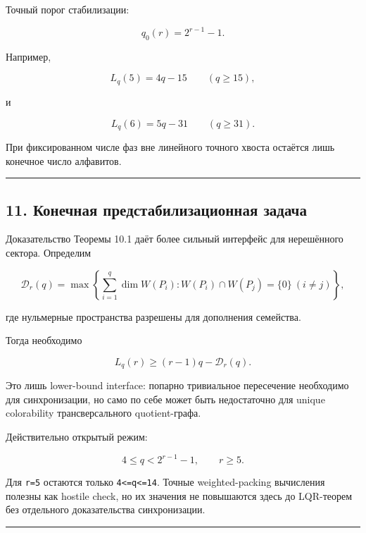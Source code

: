 Точный порог стабилизации:

\[
\boxed{q_0(r)=2^{r-1}-1.}
\tag{55}
\]

Например,

\[
L_q(5)=4q-15\qquad(q\ge15),
\tag{56}
\]

и

\[
L_q(6)=5q-31\qquad(q\ge31).
\tag{57}
\]

При фиксированном числе фаз вне линейного точного хвоста остаётся лишь
конечное число алфавитов.

\begin{center}\rule{0.5\linewidth}{0.5pt}\end{center}

\hypertarget{ux43aux43eux43dux435ux447ux43dux430ux44f-ux43fux440ux435ux434ux441ux442ux430ux431ux438ux43bux438ux437ux430ux446ux438ux43eux43dux43dux430ux44f-ux437ux430ux434ux430ux447ux430}{%
\subsection{11. Конечная предстабилизационная
задача}\label{ux43aux43eux43dux435ux447ux43dux430ux44f-ux43fux440ux435ux434ux441ux442ux430ux431ux438ux43bux438ux437ux430ux446ux438ux43eux43dux43dux430ux44f-ux437ux430ux434ux430ux447ux430}}

Доказательство Теоремы 10.1 даёт более сильный интерфейс для нерешённого
сектора. Определим

\[
\mathcal D_r(q)
=
\max\left\{
\sum_{i=1}^q\dim W(P_i):
W(P_i)\cap W(P_j)=\{0\}\ (i\ne j)
\right\},
\tag{58}
\]

где нульмерные пространства разрешены для дополнения семейства.

Тогда необходимо

\[
L_q(r)\ge(r-1)q-\mathcal D_r(q).
\tag{59}
\]

Это лишь lower-bound interface: попарно тривиальное пересечение
необходимо для синхронизации, но само по себе может быть недостаточно
для unique colorability трансверсального quotient-графа.

Действительно открытый режим:

\[
\boxed{
4\le q<2^{r-1}-1,
\qquad r\ge5.
}
\tag{60}
\]

Для \texttt{r=5} остаются только \texttt{4\textless{}=q\textless{}=14}.
Точные weighted-packing вычисления полезны как hostile check, но их
значения не повышаются здесь до LQR-теорем без отдельного доказательства
синхронизации.

\begin{center}\rule{0.5\linewidth}{0.5pt}\end{center}

